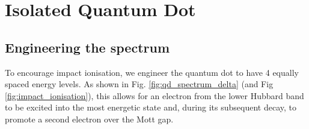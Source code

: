 \section{Isolated Quantum Dot}
\subsection{Engineering the spectrum}\label{subsec:spectrum_engineering}

To encourage impact ionisation, we engineer the quantum dot to have 4 equally spaced energy levels. As shown in Fig. \ref{fig:qd_spectrum_delta} (and Fig \ref{fig:impact_ionisation}), this allows for an electron from the lower Hubbard band to be excited into the most energetic state and, during its subsequent decay, to promote a second electron over the Mott gap.
\newline

